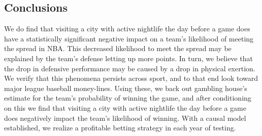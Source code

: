 \documentclass[letterpaper,12pt]{article}
\begin{document}
\subsection{Conclusions}
We do find that visiting a city with active nightlife the day before a game does have 
a statistically significant negative impact on a team's likelihood of meeting the spread in NBA. This decreased likelihood to meet the spread may be explained 
by the team's defense letting up more points. In turn, we believe that the drop in
defensive performance may be caused by a drop in physical exertion.
We verify that this phenomena persists across sport, and 
to that end look toward major league baseball money-lines. Using these, we back out gambling
house's estimate for the team's probability of winning the game, and after conditioning on this
we find that visiting a city with active nightlife the day before a game does negatively 
impact the team's likelihood of winning.
With a causal model established, we realize a profitable betting strategy in each year of testing.



\end{document}
